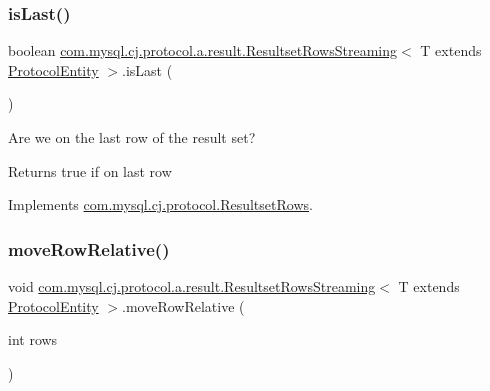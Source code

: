 \subsubsection{\texorpdfstring{is\+Last()}{isLast()}}
{\footnotesize\ttfamily boolean \mbox{\hyperlink{classcom_1_1mysql_1_1cj_1_1protocol_1_1a_1_1result_1_1_resultset_rows_streaming}{com.\+mysql.\+cj.\+protocol.\+a.\+result.\+Resultset\+Rows\+Streaming}}$<$ T extends \mbox{\hyperlink{interfacecom_1_1mysql_1_1cj_1_1protocol_1_1_protocol_entity}{Protocol\+Entity}} $>$.is\+Last (\begin{DoxyParamCaption}{ }\end{DoxyParamCaption})}

Are we on the last row of the result set?

\begin{DoxyReturn}{Returns}
true if on last row 
\end{DoxyReturn}


Implements \mbox{\hyperlink{interfacecom_1_1mysql_1_1cj_1_1protocol_1_1_resultset_rows_ae52ab20020adafaf87c2f45bae82980d}{com.\+mysql.\+cj.\+protocol.\+Resultset\+Rows}}.

\mbox{\label{classcom_1_1mysql_1_1cj_1_1protocol_1_1a_1_1result_1_1_resultset_rows_streaming_a737e87ca2de64978c94ecd245f1b9cf4}} 
\subsubsection{\texorpdfstring{move\+Row\+Relative()}{moveRowRelative()}}
{\footnotesize\ttfamily void \mbox{\hyperlink{classcom_1_1mysql_1_1cj_1_1protocol_1_1a_1_1result_1_1_resultset_rows_streaming}{com.\+mysql.\+cj.\+protocol.\+a.\+result.\+Resultset\+Rows\+Streaming}}$<$ T extends \mbox{\hyperlink{interfacecom_1_1mysql_1_1cj_1_1protocol_1_1_protocol_entity}{Protocol\+Entity}} $>$.move\+Row\+Relative (\begin{DoxyParamCaption}\item[{int}]{rows }\end{DoxyParamCaption})}

